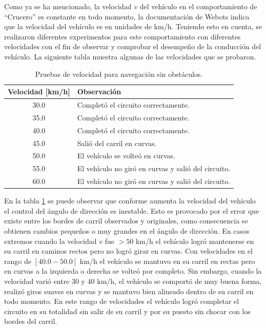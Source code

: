 Como ya se ha mencionado, la velocidad $v$ del vehículo en el comportamiento de ``Crucero'' es constante en todo momento, la documentación de Webots indica que la velocidad del vehículo es en unidades de km/h. Teniendo esto en cuenta, se realizaron diferentes experimentos para este comportamiento con diferentes velocidades con el fin de observar y comprobar el desempeño de la conducción del vehículo. La siguiente tabla muestra algunas de las velocidades que se probaron.
\begin{table}[h]
    \begin{center}
        \begin{tabular}{c|l}
        \hline
            Velocidad [km/h] & Observación\\ \hline 
            30.0 & Completó el circuito correctamente.\\ 
            35.0 & Completó el circuito correctamente.\\
            40.0 & Completó el circuito correctamente.\\ 
            45.0 & Salió del carril en curvas.\\ 
            50.0 & El vehículo se volteó en curvas.\\ 
            55.0 & El vehículo no giró en curvas y salió del circuito.\\
            60.0 & El vehículo no giró en curvas y salió del circuito.
        \end{tabular}
    \end{center}
    \caption{Pruebas de velocidad para navegación sin obstáculos.}
    \label{tab:navigation_no_obstacles}
\end{table}
En la tabla \ref{tab:navigation_no_obstacles} se puede observar que conforme aumenta la velocidad del vehículo el control del ángulo de dirección es inestable. Esto es provocado por el error que existe entre los bordes de carril observados y originales, como consecuencia se obtienen cambios pequeños o muy grandes en el ángulo de dirección. En casos extremos cuando la velocidad $v$ fue $> 50$ km/h el vehículo logró mantenerse en su carril en caminos rectos pero no logró girar en curvas. Con velocidades en el rango de $[40.0-50.0]$ km/h el vehículo se mantuvo en su carril en rectas pero en curvas a la izquierda o derecha se volteó por completo. Sin embargo, cuando la velocidad varió entre 30 y 40 km/h, el vehículo se comportó de muy buena forma, realizó giros suaves en curvas y se mantuvo bien alineado dentro de su carril en todo momento. En este rango de velocidades el vehículo logró completar el circuito en su totalidad sin salir de su carril y por su puesto sin chocar con los bordes del carril.

